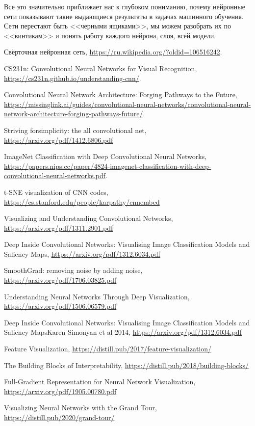 \documentclass[12pt,fleqn]{article}
\begin{document}
Все это значительно приближает нас к глубоком пониманию, почему нейронные сети показывают такие выдающиеся результаты в задачах машинного обучения. Сети перестают быть <<черными ящиками>>, мы можем разобрать их по <<винтикам>> и понять работу каждого нейрона, слоя, всей модели.

\newpage
\begin{thebibliography}{1}
Свёрточная нейронная сеть, \url{https://ru.wikipedia.org/?oldid=106516242}.

CS231n: Convolutional Neural Networks for Visual Recognition, \url{https://cs231n.github.io/understanding-cnn/}.

Convolutional Neural Network Architecture: Forging Pathways to the Future, \url{https://missinglink.ai/guides/convolutional-neural-networks/convolutional-neural-network-architecture-forging-pathways-future/}.

Striving
forsimplicity: the all convolutional net, \url{https://arxiv.org/pdf/1412.6806.pdf}

ImageNet Classification with Deep Convolutional
Neural Networks, \url{https://papers.nips.cc/paper/4824-imagenet-classification-with-deep-convolutional-neural-networks.pdf}.

t-SNE visualization of CNN codes, \url{https://cs.stanford.edu/people/karpathy/cnnembed}

Visualizing and Understanding Convolutional Networks, \url{https://arxiv.org/pdf/1311.2901.pdf}

Deep Inside Convolutional Networks: Visualising
Image Classification Models and Saliency Maps, \url{https://arxiv.org/pdf/1312.6034.pdf}

SmoothGrad: removing noise by adding noise, \url{https://arxiv.org/pdf/1706.03825.pdf}

Understanding Neural Networks Through Deep Visualization, \url{https://arxiv.org/pdf/1506.06579.pdf}

Deep Inside Convolutional Networks: Visualising Image Classification Models and Saliency MapsKaren Simonyan et al 2014, \url{https://arxiv.org/pdf/1312.6034.pdf}

Feature Visualization, \url{https://distill.pub/2017/feature-visualization/}

The Building Blocks of Interpretability, \url{https://distill.pub/2018/building-blocks/}

Full-Gradient Representation for
Neural Network Visualization, \url{https://arxiv.org/pdf/1905.00780.pdf}

Visualizing Neural Networks with the Grand Tour, \url{https://distill.pub/2020/grand-tour/}

\end{thebibliography}
\end{document}
